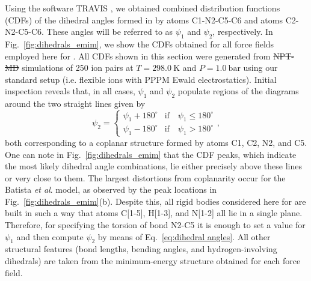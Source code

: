 \documentclass[3p,twocolumn]{elsarticle}
\providecommand{\DIFadd}[1]{{\protect\color{blue}\uwave{#1}}} %
\providecommand{\DIFdel}[1]{{\protect\color{red}\sout{#1}}}                      %
\providecommand{\DIFaddbegin}{} %
\providecommand{\DIFaddend}{} %
\providecommand{\DIFdelbegin}{} %
\providecommand{\DIFdelend}{} %
\newcommand{\DIFscaledelfig}{0.5}
\newlength{\DIFdelgraphicswidth} %
\newlength{\DIFdelgraphicsheight} %
\newcommand{\DIFaddincludegraphics}[2][]{{\color{blue}\fbox{\DIFOincludegraphics[#1]{#2}}}} %
\newcommand{\DIFdelincludegraphics}[2][]{%
\sbox{\DIFdelgraphicsbox}{\DIFOincludegraphics[#1]{#2}}%
\settoboxwidth{\DIFdelgraphicswidth}{\DIFdelgraphicsbox} %
\settoboxtotalheight{\DIFdelgraphicsheight}{\DIFdelgraphicsbox} %
\scalebox{\DIFscaledelfig}{%
\parbox[b]{\DIFdelgraphicswidth}{\usebox{\DIFdelgraphicsbox}\\[-\baselineskip] \rule{\DIFdelgraphicswidth}{0em}}\llap{\resizebox{\DIFdelgraphicswidth}{\DIFdelgraphicsheight}{%
\setlength{\unitlength}{\DIFdelgraphicswidth}%
\begin{picture}(1,1)%
\thicklines\linethickness{2pt} %
{\color[rgb]{1,0,0}\put(0,0){\framebox(1,1){}}}%
{\color[rgb]{1,0,0}\put(0,0){\line( 1,1){1}}}%
{\color[rgb]{1,0,0}\put(0,1){\line(1,-1){1}}}%
\end{picture}%
}\hspace*{3pt}}} %
} %
\DeclareRobustCommand{\DIFaddbegin}{\DIFOaddbegin \let\includegraphics\DIFaddincludegraphics} %
\DeclareRobustCommand{\DIFaddend}{\DIFOaddend \let\includegraphics\DIFOincludegraphics} %
\DeclareRobustCommand{\DIFdelbegin}{\DIFOdelbegin \let\includegraphics\DIFdelincludegraphics} %
\DeclareRobustCommand{\DIFdelend}{\DIFOaddend \let\includegraphics\DIFOincludegraphics} %
\begin{document}
Using the software TRAVIS \cite{Brehm_2011}, we obtained combined distribution functions (CDFs) of the dihedral angles formed in \ce{[emim]^+} by atoms C1-N2-C5-C6 and atoms C2-N2-C5-C6.
These angles will be referred to as $\psi_1$ and $\psi_2$, respectively.
In Fig.~\ref{fig:dihedrals_emim}, we show the CDFs obtained for all force fields employed here for \ce{[emim][B(CN)_4]}.
All CDFs shown in this section were generated from \DIFdelbegin \DIFdel{NPT-MD }\DIFdelend \DIFaddbegin \DIFadd{NpT-MD }\DIFaddend simulations of 250 ion pairs at $T = 298.0~\mathrm{K}$ and \DIFdelbegin \DIFdel{$P = 1.0~\mathrm{bar}$ }\DIFdelend \DIFaddbegin \DIFadd{$p = 0.1~\mathrm{MPa}$ }\DIFaddend using our standard setup (i.e. flexible ions with PPPM Ewald electrostatics).
Initial inspection reveals that, in all cases, $\psi_1$ and $\psi_2$ populate regions of the diagrams around the two straight lines given by
\begin{equation}
\label{eq:dihedral angles}
\psi_2 = \begin{cases}
\psi_1 + 180^\circ & \text{if} \quad \psi_1 \leq 180^\circ \\
\psi_1 - 180^\circ & \text{if} \quad \psi_1 > 180^\circ
\end{cases},
\end{equation}
both corresponding to a coplanar structure formed by atoms C1, C2, N2, and C5.
One can note in Fig.~\ref{fig:dihedrals_emim} that the CDF peaks, which indicate the most likely dihedral angle combinations, lie either precisely above these lines or very close to them.
The largest distortions from coplanarity occur for the Batista \textit{et al}. \cite{Batista_2015} model, as observed by the peak locations in Fig.~\ref{fig:dihedrals_emim}(b).
Despite this, all rigid bodies considered here for \ce{[emim]^+} are built in such a way that atoms C[1-5], H[1-3], and N[1-2] all lie in a single plane.
Therefore, for specifying the torsion of bond N2-C5 it is enough to set a value for $\psi_1$ and then compute $\psi_2$ by means of Eq.~\eqref{eq:dihedral angles}.
All other structural features (bond lengths, bending angles, and hydrogen-involving dihedrals) are taken from the minimum-energy structure obtained for each force field.
\end{document}
